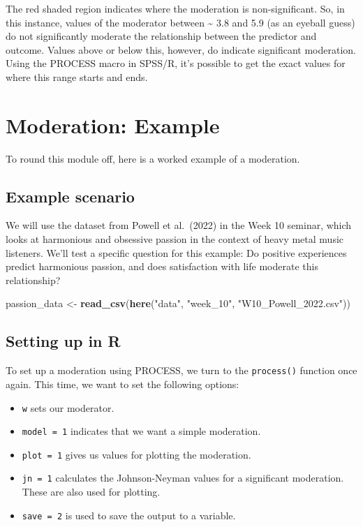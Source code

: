 \documentclass[
]{book}
\newenvironment{Shaded}{\begin{snugshade}}{\end{snugshade}}
\newcommand{\FunctionTok}[1]{\textcolor[rgb]{0.13,0.29,0.53}{\textbf{#1}}}
\newcommand{\NormalTok}[1]{#1}
\newcommand{\OtherTok}[1]{\textcolor[rgb]{0.56,0.35,0.01}{#1}}
\newcommand{\StringTok}[1]{\textcolor[rgb]{0.31,0.60,0.02}{#1}}
\providecommand{\tightlist}{%
  \setlength{\itemsep}{0pt}\setlength{\parskip}{0pt}}
\begin{document}
The red shaded region indicates where the moderation is non-significant. So, in this instance, values of the moderator between \textasciitilde{} 3.8 and 5.9 (as an eyeball guess) do not significantly moderate the relationship between the predictor and outcome. Values above or below this, however, do indicate significant moderation. Using the PROCESS macro in SPSS/R, it's possible to get the exact values for where this range starts and ends.

\section{Moderation: Example}\label{moderation-example}

To round this module off, here is a worked example of a moderation.

\subsection{Example scenario}\label{example-scenario-1}

We will use the dataset from Powell et al.~(2022) in the Week 10 seminar, which looks at harmonious and obsessive passion in the context of heavy metal music listeners. We'll test a specific question for this example: Do positive experiences predict harmonious passion, and does satisfaction with life moderate this relationship?

\begin{Shaded}
\begin{Highlighting}[]
\NormalTok{passion\_data }\OtherTok{\textless{}{-}} \FunctionTok{read\_csv}\NormalTok{(}\FunctionTok{here}\NormalTok{(}\StringTok{"data"}\NormalTok{, }\StringTok{"week\_10"}\NormalTok{, }\StringTok{"W10\_Powell\_2022.csv"}\NormalTok{))}
\end{Highlighting}
\end{Shaded}

\subsection{Setting up in R}\label{setting-up-in-r}

To set up a moderation using PROCESS, we turn to the \texttt{process()} function once again. This time, we want to set the following options:

\begin{itemize}
\tightlist
\item
  \texttt{w} sets our moderator.
\item
  \texttt{model\ =\ 1} indicates that we want a simple moderation.
\item
  \texttt{plot\ =\ 1} gives us values for plotting the moderation.
\item
  \texttt{jn\ =\ 1} calculates the Johnson-Neyman values for a significant moderation. These are also used for plotting.
\item
  \texttt{save\ =\ 2} is used to save the output to a variable.
\end{itemize}
\end{document}
